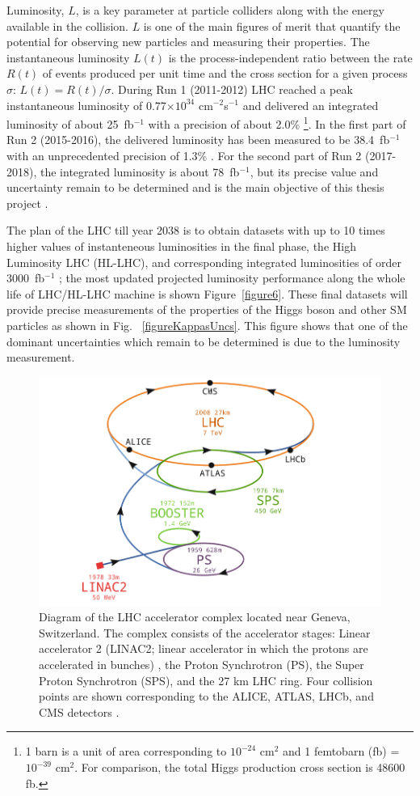 \documentclass[final,12pt]{article}
\newcommand{\lumi}[1]{{#1~fb$^{-1}$}}
\newcommand{\instlumi}[1]{#1$\times 10^{34}$ cm$^{-2}$s$^{-1}$}
\begin{document}
Luminosity, $L$, is a key parameter at particle colliders along with the energy available in the collision.
$L$ is one of the  main figures of merit that quantify the potential for observing new particles and measuring their properties.
The instantaneous luminosity $L(t)$ is the process-independent ratio between the rate $R(t)$ of events produced per unit time and the cross section for a given process $\sigma$: $L(t) = R(t)/\sigma$.
During Run 1 (2011-2012) LHC reached a peak instantaneous luminosity of \instlumi{0.77} and delivered an integrated luminosity of about \lumi{25} with a precision of about 2.0\% 
\footnote{1 barn is a unit of area corresponding to $10^{-24}$ cm${^2}$ and 1 femtobarn (fb) = $10^{-39}$ cm$^{2}$.
For comparison, the total Higgs production cross section is 48600 fb.}.
In the first part of Run 2 (2015-2016), the delivered luminosity has been measured to be \lumi{38.4} with an unprecedented precision of 1.3\% \cite{Sirunyan:2021qkt-corr}.
For the second part of Run 2 (2017-2018), the integrated luminosity is about \lumi{78}, but its precise value and uncertainty remain to be determined and is the main objective of this thesis project \cite{CMS:2018elu-corr}.

The plan of the LHC till year 2038 is to obtain datasets with up to 10 times higher values of instanteneous luminosities in the final phase, the  High Luminosity LHC (HL-LHC), and corresponding integrated luminosities of order \lumi{3000} \cite{Dainese:3}; the most updated projected luminosity performance along the  whole  life  of  LHC/HL-LHC  machine is shown Figure~\ref{figure6}.
These final datasets will provide  precise measurements of the properties of the Higgs boson and other SM particles as shown in Fig. ~\ref{figureKappasUncs}.
This figure shows that one of the dominant uncertainties which remain to be determined is due to the luminosity measurement.



\begin{figure}[H]
  \centering
  \includegraphics[width=0.7\columnwidth]{./LHC-cpx-book.png}
  \caption{Diagram of the LHC accelerator complex located near Geneva, Switzerland. The complex consists of the accelerator stages: Linear accelerator 2 (LINAC2; linear accelerator in which the protons are accelerated in bunches) , the Proton Synchrotron (PS), the Super Proton Synchrotron (SPS), and the 27 km LHC ring. Four collision points are shown corresponding to the ALICE, ATLAS, LHCb, and CMS detectors \cite{Zinser2018}.} %
  \label{figure5}
\end{figure}
\end{document}
